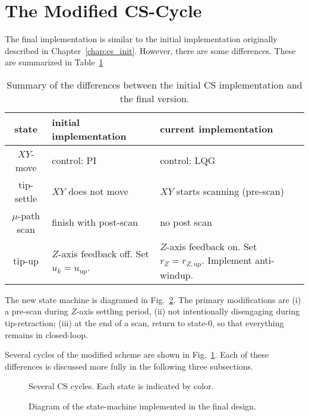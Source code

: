 \section{The Modified CS-Cycle}\label{sec:modfied_cs_cycle}
The final implementation is similar to the initial implementation originally described in Chapter~\ref{chap:cs_init}. However, there are some differences. These are summarized in
Table~\ref{tab:cs_cycle_diff}
\begin{table}
  \centering
  \caption{Summary of the differences between the initial CS implementation and the final version.}
  \label{tab:cs_cycle_diff}
  \begin{tabular}{c|p{1.75in}|p{1.75in}}
    state &  initial implementation & current implementation \\
    \hline
    $XY$-move & control: PI     & control: LQG           \\
    \hline
    tip-settle & $XY$ does not move & $XY$ starts scanning  (pre-scan)\\
    \hline
    $\mu$-path scan & finish with post-scan & no post scan \\
    \hline
    tip-up & $Z$-axis feedback off. Set ${u_k=u_{\textrm{up}}}$. & $Z$-axis feedback on. Set ${r_Z=r_{Z,\textrm{up}}}$. Implement anti-windup. \\
  \end{tabular}
\end{table}
The new state machine is diagramed in Fig.~\ref{fig:sm_final}. 
The primary modifications are (i) a pre-scan during $Z$-axis settling period, (ii) not intentionally disengaging during tip-retraction; (iii) at the end of a scan, return to state-0, so that everything remains in closed-loop.

Several cycles of the modified scheme are shown in Fig.~\ref{fig:cs_cycle_final}. Each of these differences is discussed more fully in the following three subsections.
\begin{figure}[ht!]
  \centering
  
  \caption{Several CS cycles. Each state is indicated by color.}
  \label{fig:cs_cycle_final}
\end{figure}

\begin{figure}
  \centering
    
    \caption{Diagram of the state-machine implemented in the final design.}
    \label{fig:sm_final}
\end{figure}

